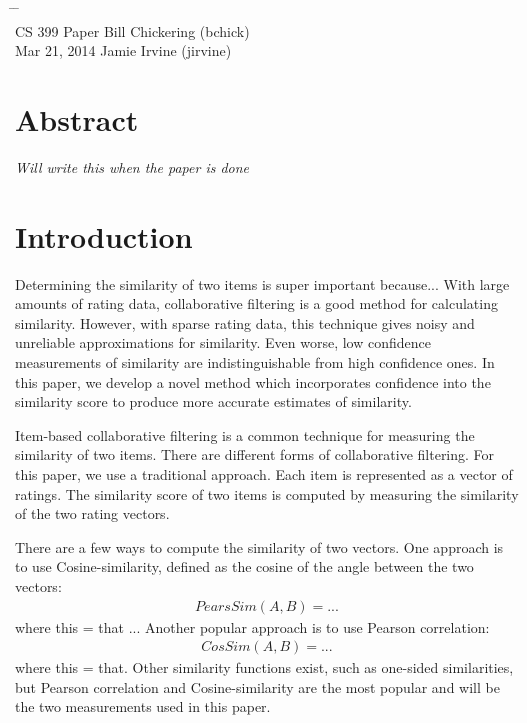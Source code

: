 \documentclass[10pt]{article}
\begin{document}

{\LARGE\bf
\begin{tabbing}
\hspace{2.8in} \= \hspace{1.3in} \= \hspace{1.2in} \= \\

CS 399 \> Paper \> Bill Chickering (bchick)\\
\normalsize Mar 21, 2014 \> \> Jamie Irvine (jirvine)
\end{tabbing}
} \vspace{.4in}

\section*{Abstract}
\emph{Will write this when the paper is done}

\section*{Introduction}
Determining the similarity of two items is super important because... With large
amounts of rating data, collaborative filtering is a good method for
calculating similarity. However, with sparse rating data, this
technique gives noisy and unreliable approximations for similarity. Even worse, 
low confidence measurements of similarity are indistinguishable from high
confidence ones. In this paper, we develop a novel method which incorporates
confidence into the similarity score to produce more accurate estimates of
similarity.
 
Item-based collaborative filtering is a common technique for measuring the similarity 
of two items. There are different forms of collaborative filtering. For
this paper, we use a traditional approach. Each item is represented as a vector
of ratings. The similarity score of two items is computed by measuring the similarity
of the two rating vectors.

There are a few ways to compute the similarity of two vectors. One approach is
to use Cosine-similarity, defined as the cosine of the angle between the two vectors:
\begin{align}
PearsSim(A, B) = ...
\end{align}
where this = that ... Another popular approach is to use Pearson correlation:
\begin{align}
CosSim(A, B) = ...
\end{align}
where this = that.  Other similarity functions exist, such as one-sided similarities, but Pearson
correlation and Cosine-similarity are the most popular and will be the two
measurements used in this paper. \footnotemark
\end{document}
